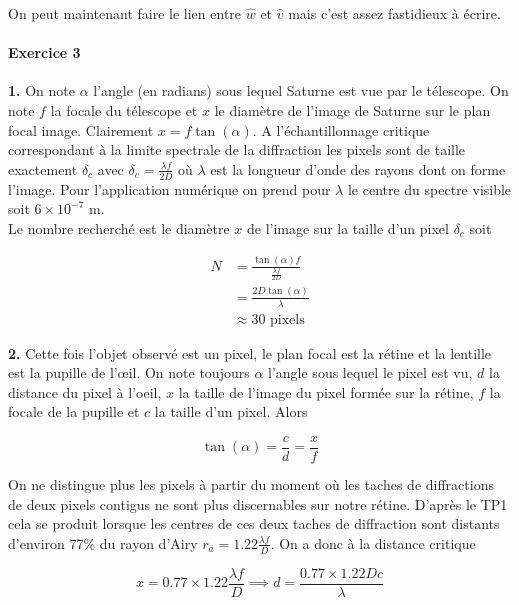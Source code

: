 \documentclass[a4paper, 11pt]{article}
\begin{document}
On peut maintenant faire le lien entre $\hat{w}$ et $\hat{v}$ mais c'est assez fastidieux à écrire.

\paragraph{Exercice 3}

\textbf{1.} On note $\alpha$ l'angle (en radians) sous lequel Saturne est vue par le télescope. On note $f$ la focale du
télescope et $x$ le diamètre de l'image de Saturne sur le plan focal image. Clairement $x = f\tan(\alpha)$. A
l'échantillonnage critique correspondant à la limite spectrale de la diffraction les pixels sont de taille exactement
$\delta_c$ avec $\delta_c = \frac{\lambda f}{2D}$ où $\lambda$ est la longueur d'onde des rayons dont on forme l'image.
Pour l'application numérique on prend pour $\lambda$ le centre du spectre visible soit $6\times 10^{-7}$ m. \\

Le nombre recherché est le diamètre $x$ de l'image sur la taille d'un pixel $\delta_c$ soit 

\begin{align*}
  N &= \frac{\tan(\alpha)f}{\frac{\lambda f}{2D}}  \\
  &= \frac{2D\tan(\alpha)}{\lambda} \\
  &\approx 30 \text{ pixels} 
\end{align*}

\clearpage

\textbf{2.} Cette fois l'objet observé est un pixel, le plan focal est la rétine et la lentille est la
pupille de l'œil. On note toujours $\alpha$ l'angle sous lequel le pixel est vu, $d$ la distance du pixel à l'oeil, $x$
la taille de l'image du pixel formée sur la rétine, $f$ la focale de la pupille et $c$ la taille d'un pixel. Alors 

\begin{equation*}
  \tan(\alpha) = \frac{c}{d} = \frac{x}{f}
\end{equation*}

On ne distingue plus les pixels à partir du moment où les taches de diffractions de deux pixels contigus ne sont plus
discernables sur notre rétine. D'après le TP1 cela se produit lorsque les centres de ces deux taches de diffraction sont
distants d'environ 77\% du rayon d'Airy $r_a = 1.22\frac{\lambda f}{D}$. On a donc à la distance critique  

\begin{equation*}
  x = 0.77\times1.22\frac{\lambda f}{D} \implies d = \frac{0.77\times1.22Dc}{\lambda} 
\end{equation*}
\end{document}
